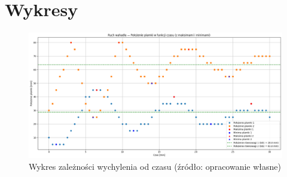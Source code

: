 \documentclass[a4paper,12pt]{article}
\begin{document}
\section{Wykresy}

\begin{figure}[H]
    \centering
    \includegraphics[width=0.9\textheight,angle=90]{wykres.png}
    \caption{Wykres zależności wychylenia od czasu (źródło: opracowanie własne)}
    \label{fig:wykres}
\end{figure}




\end{document}
